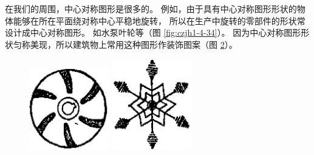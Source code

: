 \begin{figure}[htbp]
    \centering
    
    \caption{}\label{fig:czjh1-4-33}
\end{figure}

在我们的周围，中心对称图形是很多的。
例如，由于具有中心对称图形形状的物体能够在所在平面绕对称中心平稳地旋转，
所以在生产中旋转的零部件的形状常设计成中心对称图形。
如水泵叶轮等（图 \ref{fig:czjh1-4-34}）。
因为中心对称图形形状匀称美现，所以建筑物上常用这种图形作装饰图案（图 \ref{fig:czjh1-4-35}）。

\begin{figure}[htbp]
    \centering
    \begin{minipage}[b]{7cm}
        \centering
        \includegraphics[width=3.5cm]{../pic/czjh1-ch4-34.png}
        \caption{}\label{fig:czjh1-4-34}
    \end{minipage}
    \qquad
    \begin{minipage}[b]{7cm}
        \centering
        \includegraphics[width=3.5cm]{../pic/czjh1-ch4-35.png}
        \caption{}\label{fig:czjh1-4-35}
    \end{minipage}
\end{figure}

\begin{lianxi}




\end{lianxi}

